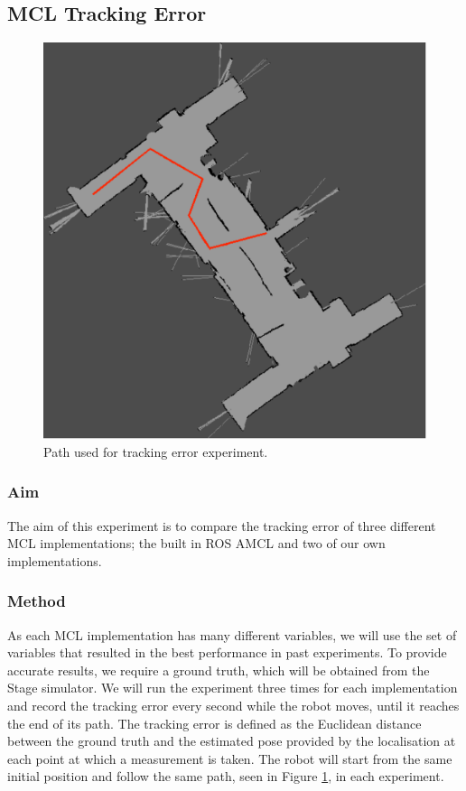 \documentclass[conference]{IEEEtran}
\begin{document}
\subsection{MCL Tracking Error}
\begin{figure}
  \includegraphics[width=\columnwidth]{localisation-experiment-path}
  \caption{Path used for tracking error experiment.}
  \label{fig:locpath}
\end{figure}
\subsubsection{Aim}
The aim of this experiment is to compare the tracking error of three different MCL implementations; the built in ROS AMCL and two of our own implementations.
\subsubsection{Method}
As each MCL implementation has many different variables, we will use the set of variables that resulted in the best performance in past experiments. To provide accurate results, we require a ground truth, which will be obtained from the Stage simulator. We will run the experiment three times for each implementation and record the tracking error every second while the robot moves, until it reaches the end of its path. The tracking error is defined as the Euclidean distance between the ground truth and the estimated pose provided by the localisation at each point at which a measurement is taken. The robot will start from the same initial position and follow the same path, seen in Figure \ref{fig:locpath}, in each experiment.
\end{document}
